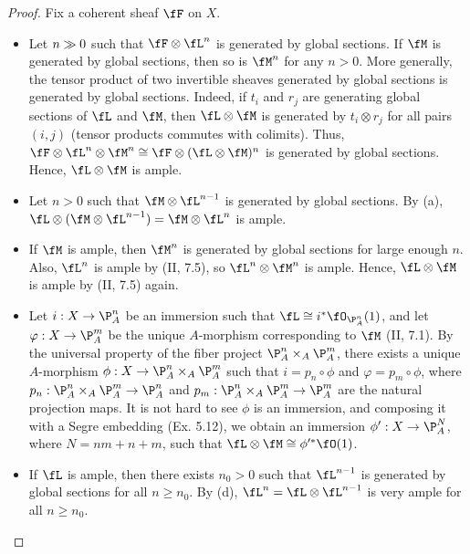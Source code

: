 \documentclass[a4paper]{article}
\begin{document}
\begin{enumerate} [label=\textbf{\arabic*.}, leftmargin=-0em]
          \begin{proof} Fix a coherent sheaf $\fF$ on $X$.
              \begin{itemize} [leftmargin=0cm]
                  \item[(a)] Let $n \gg 0$ such that $\fF \otimes \fL^n$ is generated by global sections.
                        If $\fM$ is generated by global sections, then so is $\fM^n$ for any $n > 0$.
                        More generally, the tensor product of two invertible sheaves generated by global sections is generated by global sections.
                        Indeed, if $t_i$ and $r_j$ are generating global sections of $\fL$ and $\fM$, then $\fL \otimes \fM$ is generated by $t_i \otimes r_j$ for all pairs $(i, j)$ (tensor products commutes with colimits).
                        Thus, $\fF \otimes \fL^n \otimes \fM^n \cong \fF \otimes (\fL \otimes \fM)^n$ is generated by global sections. Hence, $\fL \otimes \fM$ is ample.

                  \item[(b)] Let $n > 0$ such that $\fM \otimes \fL^{n - 1}$ is generated by global sections. By (a), $\fL \otimes (\fM \otimes \fL^{n - 1}) = \fM \otimes \fL^n$ is ample.

                  \item[(c)] If $\fM$ is ample, then $\fM^n$ is generated by global sections for large enough $n$. Also, $\fL^n$ is ample by (II, 7.5), so $\fL^n \otimes \fM^n$ is ample. Hence, $\fL \otimes \fM$ is ample by (II, 7.5) again.

                  \item[(d)] Let $i : X \to \P_A^n$ be an immersion such that $\fL \cong i^*\fO_{\P_A^n}(1)$, and let $\varphi : X \to \P_A^m$ be the unique $A$-morphism corresponding to $\fM$ (II, 7.1).
                        By the universal property of the fiber project $\P_A^n \times_A \P_A^m$, there exists a unique $A$-morphism $\phi : X \to \P_A^n \times_A \P_A^m$ such that $i = p_n \circ \phi$ and $\varphi = p_m \circ \phi$, where $p_n : \P_A^n \times_A \P_A^m \to \P_A^n$ and $p_m : \P_A^n \times_A \P_A^m \to \P_A^m$ are the natural projection maps.
                        It is not hard to see $\phi$ is an immersion, and composing it with a Segre embedding (Ex. 5.12), we obtain an immersion $\phi' : X \to \P_A^N$, where $N = nm + n + m$, such that $\fL \otimes \fM \cong \phi'^* \fO(1)$.

                  \item[(e)] If $\fL$ is ample, then there exists $n_0 > 0$ such that $\fL^{n - 1}$ is generated by global sections for all $n \geq n_0$. By (d), $\fL^n = \fL \otimes \fL^{n - 1}$ is very ample for all $n \geq n_0$.
              \end{itemize}
          \end{proof}

\end{enumerate}
\end{document}
